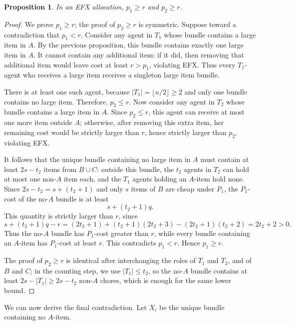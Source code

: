 \documentclass{article}
\newtheorem{proposition}{Proposition}
\theoremstyle{definition}
\begin{document}
\begin{proposition}
    In an EFX allocation, $p_1\ge r$ and $p_2\ge r$.
\end{proposition}
\begin{proof}
We prove $p_1\ge r$; the proof of $p_2\ge r$ is symmetric. Suppose toward a contradiction that $p_1<r$. 
Consider any agent in $T_1$ whose bundle contains a large item in $A$. 
By the previous proposition, this bundle contains exactly one large item in $A$. 
It cannot contain any additional item: if it did, then removing that additional item would leave cost at least $r>p_1$, violating EFX. 
Thus every $T_1$-agent who receives a large item receives a singleton large item bundle.

There is at least one such agent, because $|T_1|=\lfloor n/2\rfloor\ge 2$ and only one bundle contains no large item. Therefore, $p_2\le r$. Now consider any agent in $T_2$ whose bundle contains a large item in $A$. Since $p_2\le r$, this agent can receive at most one more item outside $A$; otherwise, after removing this extra item, her remaining cost would be strictly larger than $r$, hence strictly larger than $p_2$, violating EFX.

It follows that the unique bundle containing no large item in $A$ must contain at least $2s-t_2$ items from $B\cup C$: outside this bundle, the $t_2$ agents in $T_2$ can hold at most one non-$A$ item each, and the $T_1$ agents holding an $A$-item hold none. 
Since $2s-t_2=s+(t_2+1)$ and only $s$ items of $B$ are cheap under $P_1$, the $P_1$-cost of the no-$A$ bundle is at least
\[
    s+(t_2+1)q.
\]
This quantity is strictly larger than $r$, since
\[
    s+(t_2+1)q-r
    =(2t_2+1)+(t_2+1)(2t_2+3)-(2t_2+1)(t_2+2)
    =2t_2+2>0.
\]
Thus the no-$A$ bundle has $P_1$-cost greater than $r$, while every bundle containing an $A$-item has $P_1$-cost at least $r$. This contradicts $p_1<r$. Hence $p_1\ge r$. 

The proof of $p_2\ge r$ is identical after interchanging the roles of $T_1$ and $T_2$, and of $B$ and $C$; in the counting step, we use $|T_1|\le t_2$, so the no-$A$ bundle contains at least $2s-|T_1|\ge 2s-t_2$ non-$A$ chores, which is enough for the same lower bound. 
\end{proof}


We can now derive the final contradiction. Let $X_i$ be the unique bundle containing no $A$-item.
\end{document}
